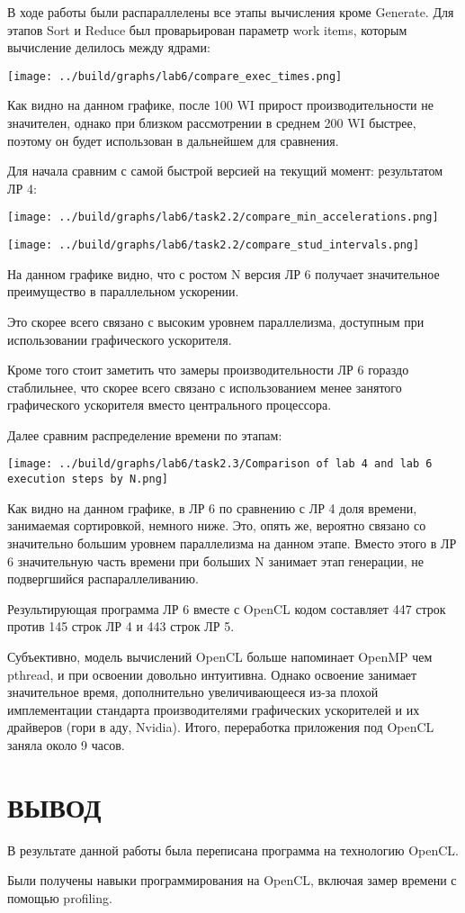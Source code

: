 \documentclass[14pt, a4paper, oneside, final]{extarticle}
\begin{document}
В ходе работы были распараллелены все этапы вычисления кроме Generate. Для этапов Sort и Reduce был проварьирован параметр work items, которым вычисление делилось между ядрами:

\texttt{[image: ../build/graphs/lab6/compare\_exec\_times.png]}

Как видно на данном графике, после 100 WI прирост производительности не значителен, однако при близком рассмотрении в среднем 200 WI быстрее, поэтому он будет использован в дальнейшем для сравнения.

Для начала сравним с самой быстрой версией на текущий момент: результатом ЛР 4:

\texttt{[image: ../build/graphs/lab6/task2.2/compare\_min\_accelerations.png]}

\texttt{[image: ../build/graphs/lab6/task2.2/compare\_stud\_intervals.png]}

На данном графике видно, что с ростом N версия ЛР 6 получает значительное преимущество в параллельном ускорении.

Это скорее всего связано с высоким уровнем параллелизма, доступным при использовании графического ускорителя.

Кроме того стоит заметить что замеры производительности ЛР 6 гораздо стаблильнее, что скорее всего связано с использованием менее занятого графического ускорителя вместо центрального процессора.

Далее сравним распределение времени по этапам:

\texttt{[image: ../build/graphs/lab6/task2.3/Comparison of lab 4 and lab 6 execution steps by N.png]}

Как видно на данном графике, в ЛР 6 по сравнению с ЛР 4 доля времени, занимаемая сортировкой, немного ниже. Это, опять же, вероятно связано со значительно большим уровнем параллелизма на данном этапе. Вместо этого в ЛР 6 значительную часть времени при больших N занимает этап генерации, не подвергшийся распараллеливанию.

Результирующая программа ЛР 6 вместе с OpenCL кодом составляет 447 строк против 145 строк ЛР 4 и 443 строк ЛР 5.

Субъективно, модель вычислений OpenCL больше напоминает OpenMP чем pthread, и при освоении довольно интуитивна. Однако освоение занимает значительное время, дополнительно увеличивающееся из-за плохой имплементации стандарта производителями графических ускорителей и их драйверов (гори в аду, Nvidia). Итого, переработка приложения под OpenCL заняла около 9 часов.

\clearpage
\section*{ВЫВОД}

В результате данной работы была переписана программа на технологию OpenCL.

Были получены навыки программирования на OpenCL, включая замер времени с помощью profiling.
\end{document}
